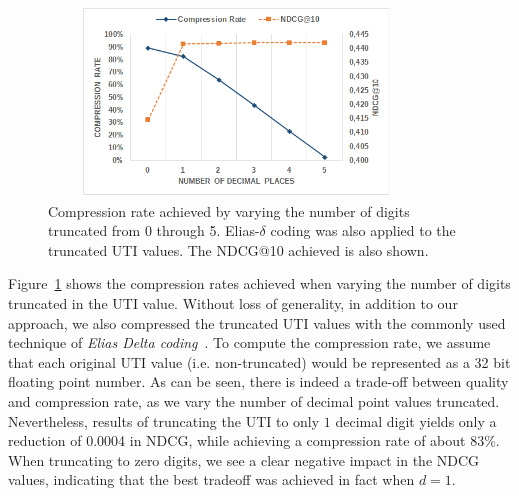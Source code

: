 \documentclass[preprint,review,10pt,3p]{elsarticle}
\begin{document}

\begin{figure}[ht!]
\centering
\includegraphics[width=10cm, height=5cm]{im_cr_ndcg_lambda.png}
\caption{Compression rate achieved by varying the number of digits truncated from 0 through 5. Elias-$\delta$ coding was also applied to the truncated UTI values. The NDCG@10 achieved is also shown.}
\label{fig:crq}
\end{figure}

Figure~\ref{fig:crq} shows the compression rates achieved when varying the number of digits truncated in the UTI value. Without loss of generality, in addition to our approach, we also compressed the truncated UTI values with the commonly used technique of \textit{Elias Delta coding}~\cite{elias1975universal}. To compute the compression rate, we assume that each original UTI value (i.e. non-truncated) would be represented as a 32 bit floating point number. 
As can be seen, there is indeed a trade-off between quality and compression rate, as we vary the number of decimal point values truncated.
Nevertheless, results of truncating the UTI to only $1$ decimal digit yields only a reduction of 0.0004 in NDCG, while achieving a compression rate of about 83\%.
When truncating to zero digits, we see a clear negative impact in the NDCG values, indicating that the best tradeoff was achieved in fact when $d=1$.




\end{document}
